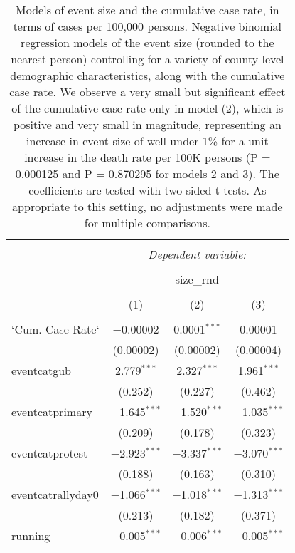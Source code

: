 
\begin{table}[!htbp] \centering 
  \caption{Models of event size and the cumulative case rate, in terms of cases per 100,000 persons. Negative binomial regression models of the event size (rounded to the nearest person) controlling for a variety of county-level demographic characteristics, along with the cumulative case rate. We observe a very small but significant effect of the cumulative case rate only in model (2), which is positive and very small in magnitude, representing an increase in event size of well under 1\% for a unit increase in the death rate per 100K persons (P = 0.000125 and P = 0.870295 for models 2 and 3). The coefficients are tested with two-sided t-tests. As appropriate to this setting, no adjustments were made for multiple comparisons.} 
  \label{tbl-death} 
\tiny 
\begin{tabular}{@{\extracolsep{5pt}}lccc} 
\\[-1.8ex]\hline 
\hline \\[-1.8ex] 
 & \multicolumn{3}{c}{\textit{Dependent variable:}} \\ 
\cline{2-4} 
\\[-1.8ex] & \multicolumn{3}{c}{size\_rnd} \\ 
\\[-1.8ex] & (1) & (2) & (3)\\ 
\hline \\[-1.8ex] 
 `Cum. Case Rate` & $-$0.00002 & 0.0001$^{***}$ & 0.00001 \\ 
  & (0.00002) & (0.00002) & (0.00004) \\ 
  eventcatgub & 2.779$^{***}$ & 2.327$^{***}$ & 1.961$^{***}$ \\ 
  & (0.252) & (0.227) & (0.462) \\ 
  eventcatprimary & $-$1.645$^{***}$ & $-$1.520$^{***}$ & $-$1.035$^{***}$ \\ 
  & (0.209) & (0.178) & (0.323) \\ 
  eventcatprotest & $-$2.923$^{***}$ & $-$3.337$^{***}$ & $-$3.070$^{***}$ \\ 
  & (0.188) & (0.163) & (0.310) \\ 
  eventcatrallyday0 & $-$1.066$^{***}$ & $-$1.018$^{***}$ & $-$1.313$^{***}$ \\ 
  & (0.213) & (0.182) & (0.371) \\ 
  running & $-$0.005$^{***}$ & $-$0.006$^{***}$ & $-$0.005$^{***}$ \\ 

\end{tabular}
\end{table}
